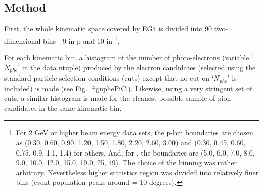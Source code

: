 \subsection{Method}
First, %
the whole kinematic space covered by EG4 is divided into 90 two-dimensional bins - 9 in p and 10 in %
\thns\footnote{For 2 GeV or higher beam energy data sets, the p-bin boundaries are chosen as (0.30, 0.60, 0.90, 1.20, 1.50, 1.80, 2.20, 2.60, 3.00) and (0.30, 0.45, 0.60, 0.75, 0.9, 1.1, 1.4) for others. And, for \thns, the boundaries are (5.0, 6.0, 7.0, 8.0, 9.0, 10.0, 12.0, 15.0, 19.0, 25, 49). The choice of the binning was rather arbitrary. Nevertheless higher statistics region was divided into relatively finer bins (event population peaks around \thns = 10 degrees).}.






For each kinematic bin, a histogram of the number of photo-electrons (variable `$N_{phe}$' in the data ntuple) produced by the electron candidates (selected using the standard particle selection conditions (cuts) except that     no cut on `$N_{phe}$' is included) %
is made (see Fig. \ref{fignphePiC}). Likewise, using a very stringent set of cuts, a similar histogram is made for the cleanest possible sample of pion candidates in the same kinematic bin. %


